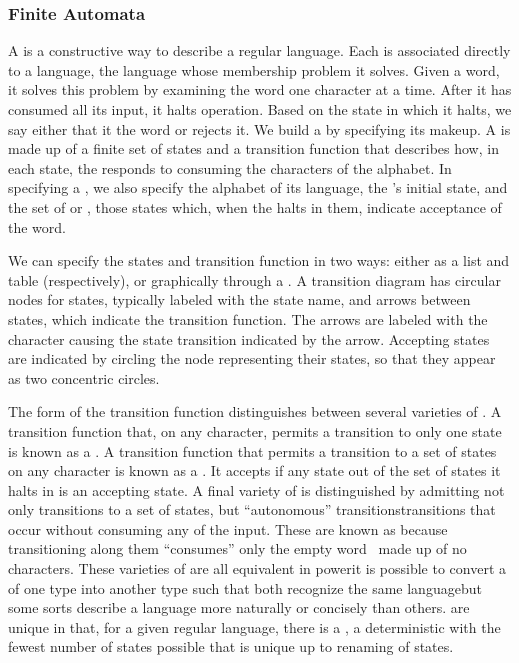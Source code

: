 \subsubsection{Finite Automata}
A \FA is a constructive way to describe a regular language. Each \FA is associated directly to a language, the language whose membership problem it solves. Given a word, it solves this problem by examining the word one character at a time. After it has consumed all its input, it halts operation. Based on the state in which it halts, we say either that it  the word or rejects it. We build a \FA by specifying its makeup. A \FA is made up of a finite set of states and a transition function that describes how, in each state, the \FA responds to consuming the characters of the alphabet. In specifying a \FA{}, we also specify the alphabet of its language, the \FA's initial state, and the set of  or , those states which, when the \FA halts in them, indicate acceptance of the word.

We can specify the states and transition function in two ways: either as a list and table (respectively), or graphically through a . A transition diagram has circular nodes for states, typically labeled with the state name, and arrows between states, which indicate the transition function. The arrows are labeled with the character causing the state transition indicated by the arrow. Accepting states are indicated by circling the node representing their states, so that they appear as two concentric circles.

The form of the transition function distinguishes between several varieties of \FAs. A transition function that, on any character, permits a transition to only one state is known as a . A transition function that permits a transition to a set of states on any character is known as a . It accepts if any state out of the set of states it halts in is an accepting state. A final variety of \FA is distinguished by admitting not only transitions to a set of states, but ``autonomous'' transitions\empause transitions that occur without consuming any of the input. These are known as  because transitioning along them ``consumes'' only the empty word \emptyword\ made up of no characters. These varieties of \FAs are all equivalent in power\empause it is possible to convert a \FA of one type into another type such that both recognize the same language\empause but some sorts describe a language more naturally or concisely than others. \FAs[F] are unique in that, for a given regular language, there is a , a deterministic \FA with the fewest number of states possible that is unique up to renaming of states.

